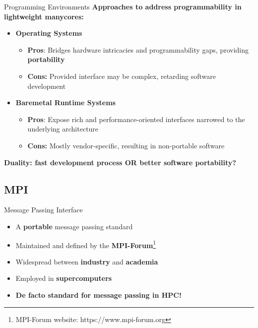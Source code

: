 \documentclass[english,aspectratio=169]{lapesd-slides}
\begin{document}
      \begin{frame}{Programming Environments}
        \textbf{Approaches to address programmability in lightweight manycores:}
        \vspace{0.2cm}
        \begin{itemize}
          \item \textbf{Operating Systems}
          \begin{itemize}
            \item \textbf{Pros}: Bridges hardware intricacies and programmability gaps, providing
              \textbf{portability}
            \item \textbf{Cons:} Provided interface may be complex, retarding
              software development
          \end{itemize}

          \item \textbf{Baremetal Runtime Systems}
          \begin{itemize}
            \item \textbf{Pros}: Expose rich and performance-oriented interfaces narrowed to the
              underlying architecture
            \item \textbf{Cons:} Mostly vendor-specific, resulting in
              non-portable software
          \end{itemize}
        \end{itemize}

        \bigskip
        \textbf{Duality: fast development process OR better software portability?}
      \end{frame}

    \subsection{MPI}
      \begin{frame}{Message Passing Interface}
        \begin{itemize}
          \item A \textbf{portable} message passing standard
          \item Maintained and defined by the \textbf{MPI-Forum}\footnote[frame]{\scriptsize MPI-Forum website: https://www.mpi-forum.org }
          \item Widespread between \textbf{industry} and \textbf{academia}
          \item Employed in \textbf{supercomputers}
          \bigskip
          \item \textbf{De facto standard for message passing in HPC!}
        \end{itemize}
      \end{frame}
\end{document}
